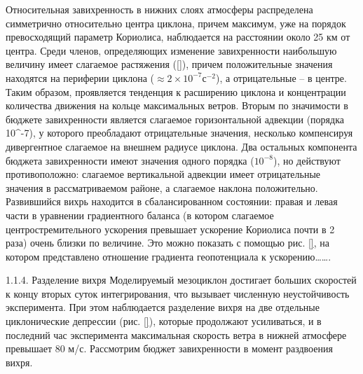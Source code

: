 Относительная завихренность в нижних слоях атмосферы распределена симметрично относительно центра циклона, причем максимум, уже на порядок превосходящий параметр Кориолиса, наблюдается на расстоянии около 25 км от центра. Среди членов, определяющих  изменение завихренности наибольшую величину имеет слагаемое растяжения (\ref{}), причем положительные значения находятся на периферии циклона ($\approx 2\times 10^{-7} с^{-2}$), а отрицательные – в центре. Таким образом, проявляется тенденция к расширению циклона и концентрации количества движения на кольце максимальных ветров. Вторым по значимости в бюджете завихренности является слагаемое горизонтальной адвекции (порядка 10^{-7}), у которого преобладают отрицательные значения, несколько компенсируя дивергентное слагаемое на внешнем радиусе циклона. Два остальных компонента бюджета завихренности имеют значения одного порядка ($10^{-8}$), но действуют противоположно: слагаемое вертикальной адвекции имеет отрицательные значения в рассматриваемом районе, а слагаемое наклона положительно.
Развившийся вихрь находится в сбалансированном состоянии: правая и левая части в уравнении градиентного баланса (в котором слагаемое центростремительного ускорения превышает ускорение Кориолиса почти в 2 раза) очень близки по величине. Это можно показать с помощью рис. \ref{}, на котором представлено отношение градиента геопотенциала к ускорению……. \cite{RT2003}

1.1.4.	Разделение вихря
Моделируемый мезоциклон достигает больших скоростей к концу вторых суток интегрирования, что вызывает численную неустойчивость эксперимента. При этом наблюдается разделение вихря на две отдельные циклонические депрессии (рис. \ref{}), которые продолжают усиливаться, и в последний час эксперимента максимальная скорость ветра в нижней атмосфере превышает 80 м/с. 
Рассмотрим бюджет завихренности в момент раздвоения вихря. 

